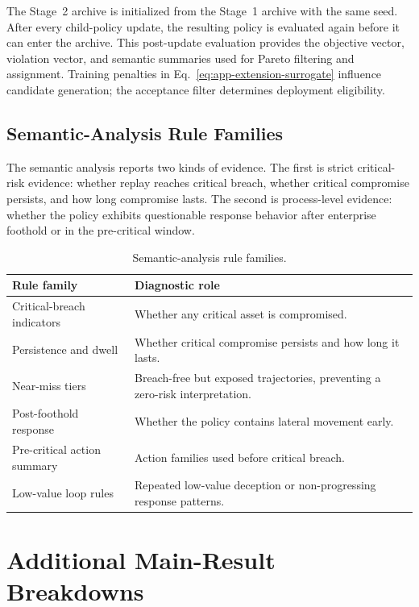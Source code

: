 \documentclass[sigconf,review,anonymous]{acmart}
\begin{document}
The Stage~2 archive is initialized from the Stage~1 archive with the same
seed. After every child-policy update, the resulting policy is evaluated
again before it can enter the archive. This post-update evaluation
provides the objective vector, violation vector, and semantic summaries
used for Pareto filtering and assignment. Training penalties in
Eq.~\ref{eq:app-extension-surrogate} influence candidate generation; the
acceptance filter determines deployment eligibility.

\subsection{Semantic-Analysis Rule Families}
\label{app:semantic-rules}

The semantic analysis reports two kinds of evidence. The first is strict
critical-risk evidence: whether replay reaches critical breach, whether
critical compromise persists, and how long compromise lasts. The second
is process-level evidence: whether the policy exhibits questionable
response behavior after enterprise foothold or in the pre-critical
window.

\begin{table}[!htbp]
\centering
\caption{Semantic-analysis rule families.}
\label{tab:app-semantic-rule-families}
\begingroup
\footnotesize
\setlength{\tabcolsep}{3pt}
\renewcommand{\arraystretch}{1.12}
\begin{tabular*}{\columnwidth}{@{\extracolsep{\fill}}p{}p{}@{}}
\toprule
Rule family & Diagnostic role \\
\midrule
Critical-breach indicators & Whether any critical asset is compromised. \\
Persistence and dwell & Whether critical compromise persists and how long it lasts. \\
Near-miss tiers & Breach-free but exposed trajectories, preventing a zero-risk interpretation. \\
Post-foothold response & Whether the policy contains lateral movement early. \\
Pre-critical action summary & Action families used before critical breach. \\
Low-value loop rules & Repeated low-value deception or non-progressing response patterns. \\
\bottomrule
\end{tabular*}
\endgroup
\end{table}

\section{Additional Main-Result Breakdowns}
\label{app:additional-main-results}
\end{document}
